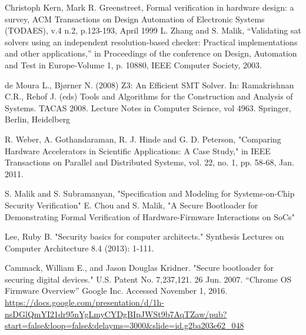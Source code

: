 \documentclass[../report.tex]{subfiles}
\begin{document}
\pagebreak
\begingroup
\renewcommand{\section}[2]{}

\begin{singlespace}
\begin{flushleft}

\begin{footnotesize}

\begin{thebibliography}{\kern\bibindent}

        Christoph Kern, Mark R. Greenstreet, Formal verification in hardware design: a survey, ACM Transactions on Design Automation of Electronic Systems (TODAES), v.4 n.2, p.123-193, April 1999 
        L. Zhang and S. Malik, “Validating sat solvers using an independent resolution-based checker: Practical implementations and other applications,” in Proceedings of the conference on Design, Automation and Test in Europe-Volume 1, p. 10880, IEEE Computer Society, 2003.

        de Moura L., Bjørner N. (2008) Z3: An Efficient SMT Solver. In: Ramakrishnan C.R., Rehof J. (eds) Tools and Algorithms for the Construction and Analysis of Systems. TACAS 2008. Lecture Notes in Computer Science, vol 4963. Springer, Berlin, Heidelberg

        R. Weber, A. Gothandaraman, R. J. Hinde and G. D. Peterson, "Comparing Hardware Accelerators in Scientific Applications: A Case Study," in IEEE Transactions on Parallel and Distributed Systems, vol. 22, no. 1, pp. 58-68, Jan. 2011.

        S. Malik and S. Subramanyan, "Specification and Modeling for Systems-on-Chip Security Verification"
E. Chou and S. Malik, "A Secure Bootloader for Demonstrating Formal Verification of Hardware-Firmware Interactions on SoCs"

        Lee, Ruby B. "Security basics for computer architects." Synthesis Lectures on Computer Architecture 8.4 (2013): 1-111.

        Cammack, William E., and Jason Douglas Kridner. "Secure bootloader for securing digital devices." U.S. Patent No. 7,237,121. 26 Jun. 2007.
        ``Chrome OS Firmware Overview'' Google Inc. Accessed November 1, 2016. \url{https://docs.google.com/presentation/d/1h-nsDGlQmYI21dr95nYgLmyCYDgBIpJWSt9b7AqTZaw/pub?start=false&loop=false&delayms=3000&slide=id.g2ba203e62_048}        


\end{thebibliography}
\end{footnotesize}
\end{flushleft}
\end{singlespace}
\end{document}
